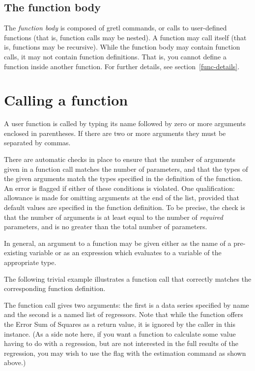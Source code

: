 \subsection{The function body}
   
The \textsl{function body} is composed of gretl commands, or
calls to user-defined functions (that is, function calls may be
nested).  A function may call itself (that is, functions may be
recursive). While the function body may contain function calls, it may
not contain function definitions.  That is, you cannot define a
function inside another function.  For further details, see
section~\ref{func-details}.


\section{Calling a function}
\label{func-call}

A user function is called by typing its name followed by zero or more
arguments enclosed in parentheses.  If there are two or more arguments
they must be separated by commas.

There are automatic checks in place to ensure that the number of
arguments given in a function call matches the number of parameters,
and that the types of the given arguments match the types specified in
the definition of the function.  An error is flagged if either of
these conditions is violated.  One qualification: allowance is made
for omitting arguments at the end of the list, provided that default
values are specified in the function definition.  To be precise, the
check is that the number of arguments is at least equal to the number
of \textit{required} parameters, and is no greater than the total
number of parameters.

In general, an argument to a function may be given either as the name
of a pre-existing variable or as an expression which evaluates to a
variable of the appropriate type.

The following trivial example illustrates a function call that
correctly matches the corresponding function definition.
    
The function call gives two arguments: the first is a data series
specified by name and the second is a named list of regressors.  Note
that while the function offers the Error Sum of Squares as a return
value, it is ignored by the caller in this instance.  (As a side note
here, if you want a function to calculate some value having to do with
a regression, but are not interested in the full results of the
regression, you may wish to use the  flag with the
estimation command as shown above.)
    
